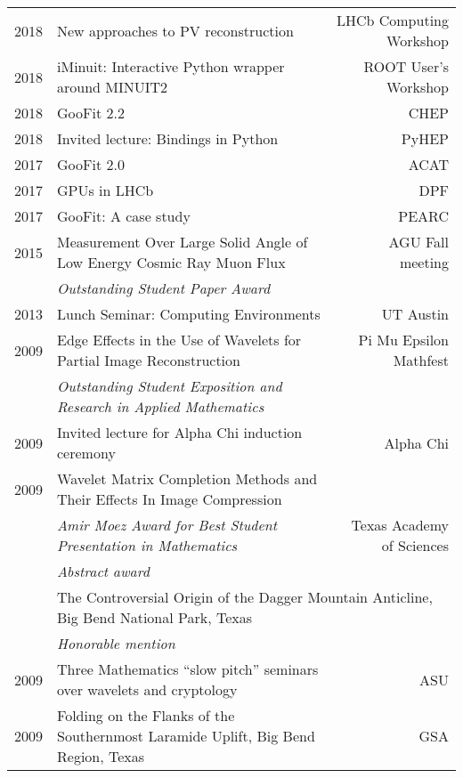 \documentclass[10pt,letterpaper,english]{moderncv}
\begin{document}
\begin{tabularx}{\textwidth}{p{.35in}Xr}
	
	2018 & New approaches to PV reconstruction & LHCb Computing Workshop \\ %
	2018 & iMinuit: Interactive Python wrapper around MINUIT2 & ROOT User's Workshop \\  %
	2018 & GooFit 2.2 & CHEP \\ %
	2018 & Invited lecture: Bindings in Python & PyHEP  \\[1ex]
	
	2017 & GooFit 2.0 & ACAT \\[1ex]
	2017 & GPUs in LHCb & DPF \\[1ex] %
	2017 & GooFit: A case study & PEARC \\[1ex]
	
	
	2015 & Measurement Over Large Solid Angle of Low Energy Cosmic Ray Muon Flux &  AGU Fall meeting \\
	 & \emph{Outstanding Student Paper Award} & \\[1ex]
	 2013 & Lunch Seminar: Computing Environments & UT Austin \\[1ex]
	 2009 & Edge Effects in the Use of Wavelets for Partial Image Reconstruction & Pi Mu Epsilon Mathfest \\
	 & \emph{Outstanding Student Exposition and Research in Applied Mathematics} & \\[1ex]
	 
	 2009 & Invited lecture for Alpha Chi induction ceremony & Alpha Chi  \\[1ex]
	 
	 2009 & Wavelet Matrix Completion Methods and Their Effects In Image Compression &  \\
	  & \emph{Amir Moez Award for Best Student Presentation in Mathematics} & Texas Academy of Sciences \\
	  & \emph{Abstract award} & \\
	  & \multicolumn{2}{l}{The Controversial Origin of the Dagger Mountain Anticline, Big Bend National Park, Texas}  \\
	  & \emph{Honorable mention} & \\[1ex]
	  
	  2009 & Three Mathematics ``slow pitch'' seminars over wavelets and cryptology & ASU \\
	  
	  2009 & Folding on the Flanks of the Southernmost Laramide Uplift, Big Bend Region, Texas & GSA \\[1em]
	  

\end{tabularx}
\end{document}
